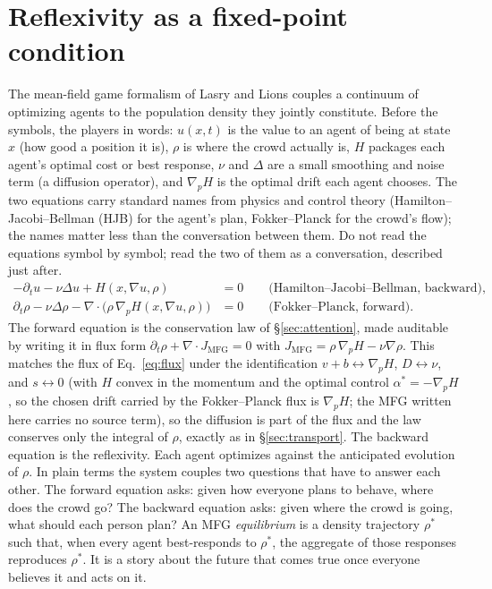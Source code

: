 \documentclass[11pt]{article}
\begin{document}
\section{Reflexivity as a fixed-point condition}
\label{sec:reflexivity}

The mean-field game formalism of Lasry and Lions \cite{lasrylions2007} couples a continuum of optimizing agents to the population density they jointly constitute. Before the symbols, the players in words: $u(x,t)$ is the value to an agent of being at state $x$ (how good a position it is), $\rho$ is where the crowd actually is, $H$ packages each agent's optimal cost or best response, $\nu$ and $\Delta$ are a small smoothing and noise term (a diffusion operator), and $\nabla_p H$ is the optimal drift each agent chooses. The two equations carry standard names from physics and control theory (Hamilton--Jacobi--Bellman (HJB) for the agent's plan, Fokker--Planck for the crowd's flow); the names matter less than the conversation between them. Do not read the equations symbol by symbol; read the two of them as a conversation, described just after.
\begin{align}
-\partial_t u - \nu \Delta u + H(x, \nabla u, \rho) &= 0 \qquad \text{(Hamilton--Jacobi--Bellman, backward)},\nonumber\\
\partial_t \rho - \nu \Delta \rho - \nabla\cdot\!\big(\rho\, \nabla_p H(x,\nabla u, \rho)\big) &= 0 \qquad \text{(Fokker--Planck, forward)} .
\label{eq:mfg}
\end{align}
The forward equation is the conservation law of \S\ref{sec:attention}, made auditable by writing it in flux form $\partial_t \rho + \nabla\cdot J_{\mathrm{MFG}} = 0$ with $J_{\mathrm{MFG}} = \rho\,\nabla_p H - \nu\nabla\rho$. This matches the flux of Eq.~\eqref{eq:flux} under the identification $v + b \leftrightarrow \nabla_p H$, $D \leftrightarrow \nu$, and $s \leftrightarrow 0$ (with $H$ convex in the momentum and the optimal control $\alpha^\ast=-\nabla_p H$, so the chosen drift carried by the Fokker--Planck flux is $\nabla_p H$; the MFG written here carries no source term), so the diffusion is part of the flux and the law conserves only the integral of $\rho$, exactly as in \S\ref{sec:transport}. The backward equation is the reflexivity. Each agent optimizes against the anticipated evolution of $\rho$. In plain terms the system couples two questions that have to answer each other. The forward equation asks: given how everyone plans to behave, where does the crowd go? The backward equation asks: given where the crowd is going, what should each person plan? An MFG \emph{equilibrium} is a density trajectory $\rho^\ast$ such that, when every agent best-responds to $\rho^\ast$, the aggregate of those responses reproduces $\rho^\ast$. It is a story about the future that comes true once everyone believes it and acts on it.
\end{document}

